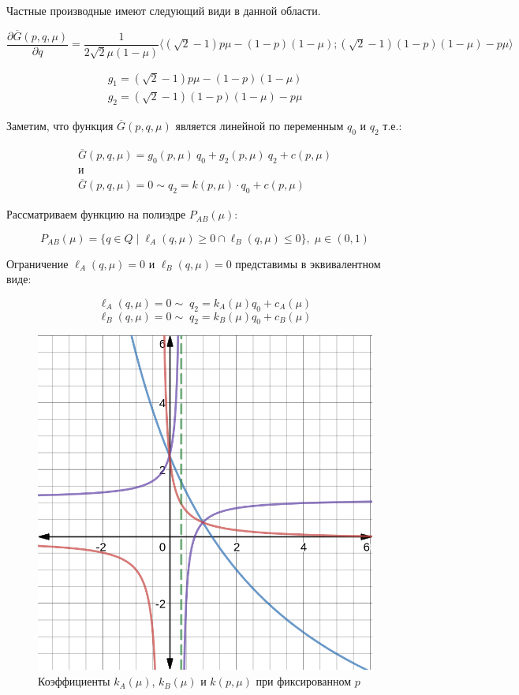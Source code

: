 \begin{flushleft}
	Частные производные имеют следующий види в данной области.
	
	$
	\dfrac{\partial \overline{G}(p,q,\mu)}{\partial q}=
	\dfrac{1}{2\sqrt{2}\mu(1-\mu)}
	\big \langle 
		(\sqrt{2} - 1)p\mu -(1-p)(1-\mu);
		(\sqrt{2} - 1)(1-p)(1-\mu) - p\mu			
	\big \rangle
	$

	\begin{gather*}
	g_1=(\sqrt{2} - 1)p\mu -(1-p)(1-\mu) \\
	g_2=(\sqrt{2} - 1)(1-p)(1-\mu) - p\mu
	\end{gather*}

 	Заметим, что функция $\overline{G}(p,q,\mu)$
 	является линейной по переменным $q_0$ и $q_2$ т.е.:

	\begin{gather*}
	\overline{G}(p,q,\mu)=g_0(p,\mu) \: q_0+g_2(p,\mu) \: q_2+c(p,\mu)
	\\
	\textrm{и}
	\\
	\overline{G}(p,q,\mu) = 0 \sim q_2 = k(p, \mu) \cdot q_0 + c(p, \mu)	
	\end{gather*}
	
	Рассматриваем функцию на полиэдре $P_{AB}(\mu):$
	
	$$P_{AB}(\mu)=
	\{
		q \in Q \; | \;  
		\ell_A(q, \mu) \geqslant 0 \cap
	 	\ell_B(q, \mu) \leqslant 0
	\},\; \mu \in (0,1) $$

	Ограничение $\ell_A(q, \mu) = 0$ и $\ell_B(q, \mu) = 0$ представимы в 
	эквивалентном виде:
	
	$$\ell_A(q,\mu)=0 \sim \; q_2=k_A(\mu)q_0+c_A(\mu)$$
	$$\ell_B(q,\mu)=0 \sim \; q_2=k_B(\mu)q_0+c_B(\mu)$$

	
	\begin{figure}[H]
		\centering
  		\includegraphics[scale=0.3]{images/graf_3_10}
  		\caption{Коэффициенты $k_A(\mu)$, $k_B(\mu)$ и $k(p,\mu)$ при фиксированном $p$}
		\label{fig:k_A,k_B,k}	
	\end{figure}	
	

\end{flushleft}
